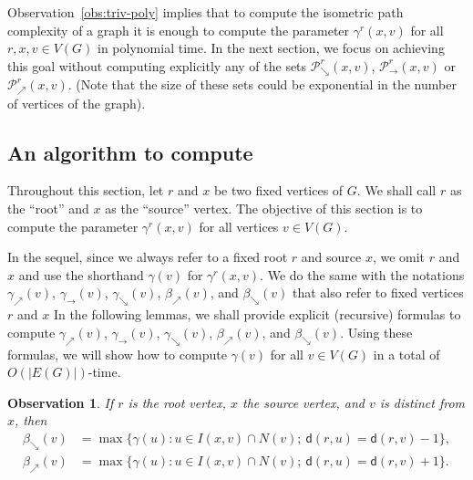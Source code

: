 \documentclass[a4paper]{article}
\newcommand{\dist}[2]{\mathsf{d}\left(#1,#2\right)}
\newcommand{\pathseta}[3]{\mathcal{P}_{\searrow}^{#1}\left(#2,#3\right)}
\newcommand{\pathseteq}[3]{\mathcal{P}_{\rightarrow}^{#1}\left(#2,#3\right)}
\newcommand{\pathsetd}[3]{\mathcal{P}_{\nearrow}^{#1}\left(#2,#3\right)}
\newtheorem{observation}[theorem]{Observation}
\begin{document}
Observation~\ref{obs:triv-poly} implies that to compute the isometric
path complexity of a graph it is enough to compute the parameter
$\gamma^r(x,v)$ for all $r,x,v\in V(G)$ in polynomial time. In the
next section, we focus on achieving this goal without computing
explicitly any of the sets $\pathseta{r}{x}{v}$, $\pathseteq{r}{x}{v}$
or $\pathsetd{r}{x}{v}$. (Note that the size of these sets could be
exponential in the number of vertices of the graph).




\subsection{An algorithm to compute }

Throughout this section, let $r$ and $x$ be two fixed vertices of $G$. We shall call $r$ as the ``root'' and $x$ as the ``source'' vertex. The objective of this section is to compute the parameter $\gamma^r(x,v)$ for all vertices $v\in V(G)$. 

In the sequel, since we always refer to a fixed root $r$ and source
$x$, we omit $r$ and $x$ and use the shorthand $\gamma(v)$ for
$\gamma^r(x,v).$ We do the same with the notations
$\gamma_{\nearrow}(v)$, $\gamma_{\rightarrow}(v)$,
$\gamma_{\searrow}(v)$, $\beta_{\nearrow}(v)$, and
$\beta_{\searrow}(v)$ that also refer to fixed vertices $r$ and
$x$
In the following lemmas, we shall provide explicit (recursive)
formulas to compute $\gamma_{\nearrow}(v)$, $\gamma_{\rightarrow}(v)$,
$\gamma_{\searrow}(v)$, $\beta_{\nearrow}(v)$, and
$\beta_{\searrow}(v)$. Using these formulas, we will show how to
compute $\gamma(v)$ for all $v\in V(G)$ in a total of
$O(|E(G)|)$-time.



\begin{observation}\label{lem:beta-arrow}
  If $r$ is the root vertex, $x$ the source vertex, and $v$ is
  distinct from $x$, then
  \begin{align*}
    \beta_{\searrow}(v) &= \max \{ \gamma(u) : u\in I(x,v) \cap N(v);\
                          \dist{r}{u}=\dist{r}{v}-1 \},\\
    \beta_{\nearrow}(v) &= \max \{ \gamma(u) : u\in I(x,v) \cap N(v);\
                          \dist{r}{u}=\dist{r}{v}+1 \}.
  \end{align*}
\end{observation}
\end{document}
